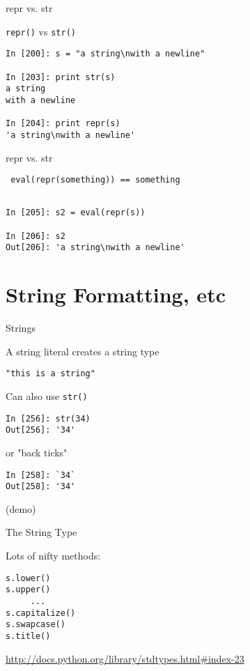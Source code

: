 \documentclass{beamer}
\begin{document}
\begin{frame}[fragile]{repr vs. str}

{\Large \verb|repr()| vs \verb|str()| }

\begin{verbatim}
In [200]: s = "a string\nwith a newline"

In [203]: print str(s)
a string
with a newline

In [204]: print repr(s)
'a string\nwith a newline'

\end{verbatim}

\end{frame}

\begin{frame}[fragile]{repr vs. str}

{\Large \verb| eval(repr(something)) == something | }

\begin{verbatim}

In [205]: s2 = eval(repr(s))

In [206]: s2
Out[206]: 'a string\nwith a newline'
\end{verbatim}

\end{frame}


\section{String Formatting, etc}

\begin{frame}[fragile]{Strings}

{\Large A string literal creates a string type}

\begin{verbatim}
"this is a string"
\end{verbatim}

{\Large Can also use \verb|str()|}

\begin{verbatim}
In [256]: str(34)
Out[256]: '34'
\end{verbatim}
{\Large or "back ticks"}
\begin{verbatim}
In [258]: `34`
Out[258]: '34'
\end{verbatim}
(demo)
\end{frame} 

\begin{frame}[fragile]{The String Type}

{\Large Lots of nifty methods:}

\begin{verbatim}
s.lower()
s.upper()
     ...
s.capitalize()
s.swapcase()
s.title()
\end{verbatim}

\url{http://docs.python.org/library/stdtypes.html#index-23}

\end{frame} 
\end{document}

